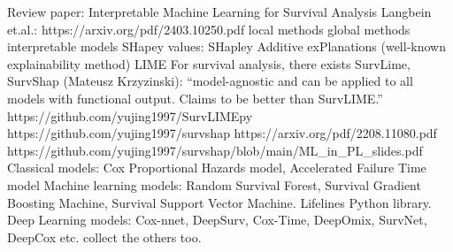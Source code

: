 \documentclass{article}%
\begin{document}
%
Review paper: Interpretable Machine Learning for Survival Analysis %
\newline%
\newline%
%
Langbein et.al.: https://arxiv.org/pdf/2403.10250.pdf %
\newline%
\newline%
%
local methods %
\newline%
\newline%
%
global methods %
\newline%
\newline%
%
interpretable models %
\newline%
\newline%
%
SHapey values: SHapley Additive exPlanations (well{-}known explainability method)%
\newline%
\newline%
%
LIME %
\newline%
\newline%
%
For survival analysis, there exists SurvLime, SurvShap (Mateusz Krzyzinski): “model{-}agnostic and can be applied to all models with functional output. Claims to be better than SurvLIME.” 	%
\newline%
\newline%
%
https://github.com/yujing1997/SurvLIMEpy%
\newline%
\newline%
%
https://github.com/yujing1997/survshap %
\newline%
\newline%
%
https://arxiv.org/pdf/2208.11080.pdf %
\newline%
\newline%
%
https://github.com/yujing1997/survshap/blob/main/ML\_in\_PL\_slides.pdf %
\newline%
\newline%
%
Classical models: Cox Proportional Hazards model, Accelerated Failure Time model %
\newline%
\newline%
%
Machine learning models: Random Survival Forest, Survival Gradient Boosting Machine, Survival Support Vector Machine. Lifelines Python library. %
\newline%
\newline%
%
Deep Learning models: Cox{-}nnet, DeepSurv, Cox{-}Time, DeepOmix, SurvNet, DeepCox etc. collect the others too. %
\newline%
\newline%
%
%
\newline%
\newline%
\end{document}
